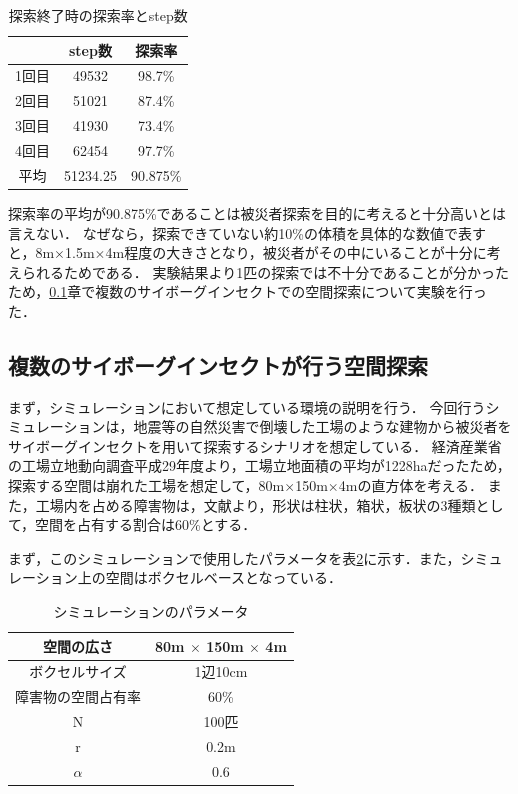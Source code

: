 \documentclass[a4paper,11pt]{jarticle}
\begin{document}
	\begin{table}
		\centering
		\caption{探索終了時の探索率とstep数}
		\begin{tabular}{|c||c|c|}
			\hline
			 & step数 & 探索率 \\ \hline \hline
			1回目 & 49532 & 98.7\% \\ \hline
			2回目 & 51021 & 87.4\% \\ \hline
			3回目 & 41930 & 73.4\% \\ \hline
			4回目 & 62454 & 97.7\% \\ \hline
			平均 & 51234.25 & 90.875\% \\ \hline
		\end{tabular}
		\label{tab:step}
	\end{table}	
	
	探索率の平均が90.875\%であることは被災者探索を目的に考えると十分高いとは言えない．
	なぜなら，探索できていない約10\%の体積を具体的な数値で表すと，8m$\times$1.5m$\times$4m程度の大きさとなり，被災者がその中にいることが十分に考えられるためである．
	実験結果より1匹の探索では不十分であることが分かったため，\ref{sec:multi}章で複数のサイボーグインセクトでの空間探索について実験を行った．
	\subsection{複数のサイボーグインセクトが行う空間探索}
	\label{sec:multi}
	まず，シミュレーションにおいて想定している環境の説明を行う．
	今回行うシミュレーションは，地震等の自然災害で倒壊した工場のような建物から被災者をサイボーグインセクトを用いて探索するシナリオを想定している．
	経済産業省の工場立地動向調査平成29年度より，工場立地面積の平均が1228haだったため，探索する空間は崩れた工場を想定して，80m$\times$150m$\times$4mの直方体を考える．
	また，工場内を占める障害物は，文献\cite{rubble}より，形状は柱状，箱状，板状の3種類として，空間を占有する割合は60\%とする．
	
	まず，このシミュレーションで使用したパラメータを表\ref{tab:simu}に示す．また，シミュレーション上の空間はボクセルベースとなっている．
	\begin{table}
		\centering
		\caption{シミュレーションのパラメータ}
		\begin{tabular}{|c|c|}
			\hline
			空間の広さ & 80m $\times$ 150m $\times$ 4m\\ \hline
			ボクセルサイズ & 1辺10cm \\ \hline
			障害物の空間占有率 & 60\% \\ \hline
			N & 100匹 \\ \hline
			r & 0.2m \\ \hline
			$\alpha$ & 0.6 \\ \hline
		\end{tabular}
	\label{tab:simu}
	\end{table}
\end{document}
